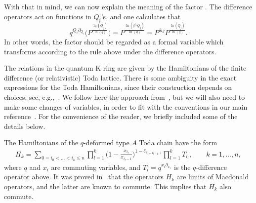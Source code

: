 \documentclass[pdftex]{sigma}
\numberwithin{equation}{section}
\theoremstyle{definition}
\begin{document}
With that in mind, we can now explain the meaning of the factor .
The difference operators  act on functions in $Q_i$'s, and
one calculates that
\[ q^{Q_i \partial_{Q_i}}\bigl(P^{\frac{\ln(Q_j)}{\ln(q)}}\bigr) =
P^{\frac{\ln(q^{\delta_{ij}} Q_j)}{\ln(q)}} = P^{\delta{ij}}
P^{\frac{\ln(Q_j)}{\ln(q)}} . \]
In other words, the factor  should be regarded as
a formal variable
which transforms according to the rule above under the difference operators.

The relations in the quantum K ring are given by the Hamiltonians of the finite difference
(or relativistic) Toda lattice. There is some ambiguity in the exact expressions for the
Toda Hamiltonians, since their construction depends on choices;
see, e.g.,~\cite[Remark~5]{givental_lee}. We follow here the approach from~\cite{gloI},
but we will also need to make some changes of variables,
in order to fit with the conventions in our main reference~\cite{givental_lee}.
For the convenience of the reader, we briefly included some of the details below.

The Hamiltonians of the $q$-deformed type $A$ Toda chain have the form
\begin{align}\label{eqn:hamil}
 H_k=\sum_{0= i_0<\dots<i_k\leq n} \prod_{l=1}^{k}\biggl(1-\frac{x_{i_l}}{x_{i_l-1}}\biggr)^{1-\delta_{i_l-i_{l-1},1}} \prod_{l=1}^{k} T_{i_l},\qquad k=1,\dots,n,
\end{align}
where $q$ and $x_i$ are commuting variables, and $T_i=q^{x_i\partial_{x_i}}$ is the $q$-difference operator above. It was proved in~\cite{gloI} that the operators $H_k$ are limits of Macdonald operators, and the latter are known to commute.
This implies that $H_k$ also commute.
\end{document}
